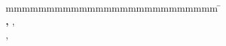 \begin{titlepage}
\begin{center}
		\vspace*{3mm}		{\textbf \abschluss}\\
		\vspace*{12mm}	\langartikelstudiengang{} \langstudiengang{} \studiengang\\
    \vspace*{3mm}		\langanderdh{} \dhbw\\
		\vspace*{12mm}	\langvon\\
		\vspace*{3mm}		{\large\textbf \autor}\\
		\vspace*{12mm}	\datumAbgabe\\
	\end{center}
	\vfill
	\begin{spacing}{1.2}
	\begin{tabbing}
		mmmmmmmmmmmmmmmmmmmmmmmmmm             \= \kill
		\textbf{\langdbbearbeitungszeit}       \>  \zeitraum\\
		\textbf{\langdbmatriknr, \langdbkurs}  \>  \martrikelnr, \kurs\\
		\textbf{\langdbfirma}                  \>  \firma, \firmenort\\
		\textbf{\langdbbetreuer}               \>  \betreuer
	\end{tabbing}
	\end{spacing}
\end{titlepage}
